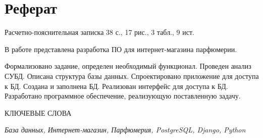 \chapter*{Реферат}

Расчетно-пояснительная записка 38 с., 17 рис., 3 табл., 9 ист.

В работе представлена разработка ПО для интернет-магазина парфюмерии.

Формализовано задание, определен необходимый функционал. Проведен анализ СУБД. Описана структура базы данных. Спроектировано приложение для доступа к БД. Создана и заполнена БД. Реализован интерфейс для доступа к БД. Разработано программное обеспечение, реализующую поставленную задачу.

КЛЮЧЕВЫЕ СЛОВА

\textit{База данных, Интернет-магазин, Парфюмерия, PostgreSQL, Django, \newline Python}